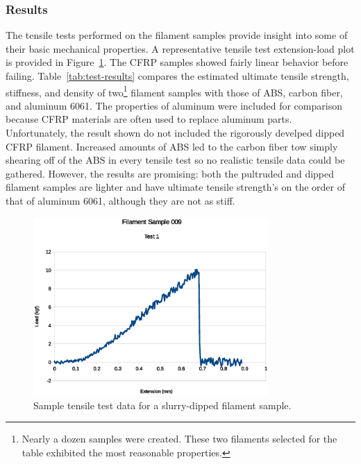 \clearpage

\subsubsection{Results}

\indent

The tensile tests performed on the filament samples provide insight into some of their basic mechanical properties. A representative tensile test extension-load plot is provided in Figure~\ref{fig:instron-sample}. The CFRP samples showed fairly linear behavior before failing. Table~\ref{tab:test-results} compares the estimated ultimate tensile strength, stiffness, and density of two\footnote{Nearly a dozen samples were created. These two filaments selected for the table exhibited the most reasonable properties.} filament samples with those of ABS, carbon fiber, and aluminum 6061. The properties of aluminum were included for comparison because CFRP materials are often used to replace aluminum parts. Unfortunately, the result shown do not included the rigorously develped dipped CFRP filament. Increased amounts of ABS led to the carbon fiber tow simply shearing off of the ABS in every tensile test so no realistic tensile data could be gathered. However, the results are promising: both the pultruded and dipped filament samples are lighter and have ultimate tensile strength's on the order of that of aluminum 6061, although they are not as stiff.\\

\begin{figure}[htp]
    \centering
    \includegraphics[width=0.8\textwidth]{./figures/009T1-instron-data}
    \caption{Sample tensile test data for a slurry-dipped filament sample.}
    \label{fig:instron-sample}
\end{figure}

